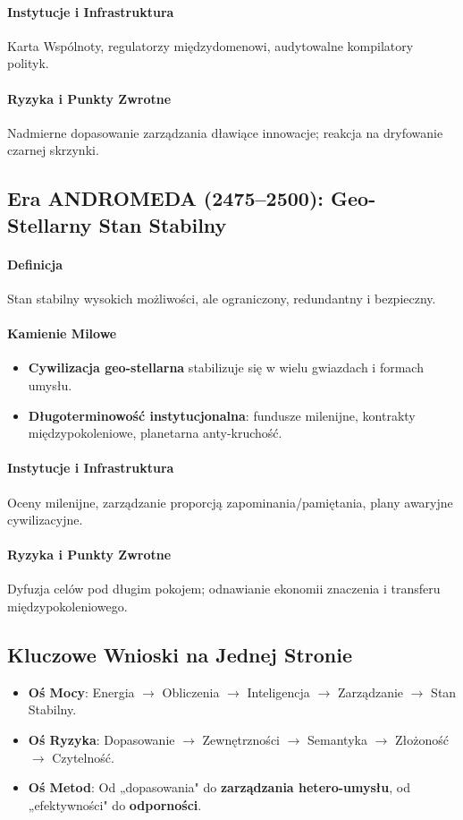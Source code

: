 \documentclass[11pt]{article}
\begin{document}
\paragraph{Instytucje i Infrastruktura} Karta Wspólnoty, regulatorzy międzydomenowi, audytowalne kompilatory polityk.

\paragraph{Ryzyka i Punkty Zwrotne} Nadmierne dopasowanie zarządzania dławiące innowacje; reakcja na dryfowanie czarnej skrzynki.

\subsection{Era ANDROMEDA (2475–2500): Geo-Stellarny Stan Stabilny}
\paragraph{Definicja} Stan stabilny wysokich możliwości, ale ograniczony, redundantny i bezpieczny.

\paragraph{Kamienie Milowe}
\begin{itemize}[noitemsep]
  \item \textbf{Cywilizacja geo-stellarna} stabilizuje się w wielu gwiazdach i formach umysłu.
  \item \textbf{Długoterminowość instytucjonalna}: fundusze milenijne, kontrakty międzypokoleniowe, planetarna anty-kruchość.
\end{itemize}

\paragraph{Instytucje i Infrastruktura} Oceny milenijne, zarządzanie proporcją zapominania/pamiętania, plany awaryjne cywilizacyjne.

\paragraph{Ryzyka i Punkty Zwrotne} Dyfuzja celów pod długim pokojem; odnawianie ekonomii znaczenia i transferu międzypokoleniowego.

\subsection{Kluczowe Wnioski na Jednej Stronie}
\begin{itemize}[noitemsep]
  \item \textbf{Oś Mocy}: Energia $\rightarrow$ Obliczenia $\rightarrow$ Inteligencja $\rightarrow$ Zarządzanie $\rightarrow$ Stan Stabilny.
  \item \textbf{Oś Ryzyka}: Dopasowanie $\rightarrow$ Zewnętrzności $\rightarrow$ Semantyka $\rightarrow$ Złożoność $\rightarrow$ Czytelność.
  \item \textbf{Oś Metod}: Od „dopasowania" do \textbf{zarządzania hetero-umysłu}, od „efektywności" do \textbf{odporności}.
\end{itemize}
\end{document}
